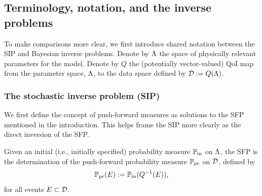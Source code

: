 


\subsection{Terminology, notation, and the inverse problems}

To make comparisons more clear, we first introduce shared notation between the SIP and Bayesian inverse problems.
Denote by ${\Lambda}$ the space of physically relevant parameters for the model.
Denote by $Q$ the (potentially vector-valued) QoI map from the parameter space, ${\Lambda}$, to the data space defined by $\mathcal{D}:= Q({\Lambda})$.

\subsubsection{The stochastic inverse problem (SIP)}

We first define the concept of push-forward measures as solutions to the SFP mentioned in the introduction.
This helps frame the SIP more clearly as the direct inversion of the SFP.
\begin{definition}\label{def:forward-problem}
  Given an initial (i.e., initially specified) probability measure $\operatorname*{\mathbb{P}_{in}}$ on ${\Lambda}$, the SFP is the determination of the push-forward probability measure $\operatorname*{\mathbb{P}_{pr}}$ on $\mathcal{D}$, defined by
\begin{equation*}
\operatorname*{\mathbb{P}_{pr}}(E) := \operatorname*{\mathbb{P}_{in}}(Q^{-1}(E)),
\end{equation*}
for all events $E\subset\mathcal{D}$.
\end{definition}

